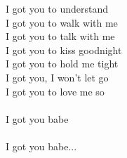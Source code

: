 \color{red} \textcolor{black}{}I got you to \textcolor{black}{}understand\\
\color{blue} I got you to walk with me\\
\color{red} I got you to talk with me\\
\color{blue} I got you to kiss goodnight\\
\color{red} I got you to hold me tight\\
\color{blue} I got you, I won't let go\\
\color{red} I got you to love me so\\
\\ \color{black}
I got  you babe\\
\\
I got you babe...
